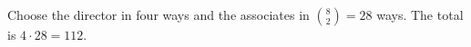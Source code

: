 Choose the director in four ways and the associates in $\binom82=28$ ways. The total is $4\cdot28=\boxed{112}$.
